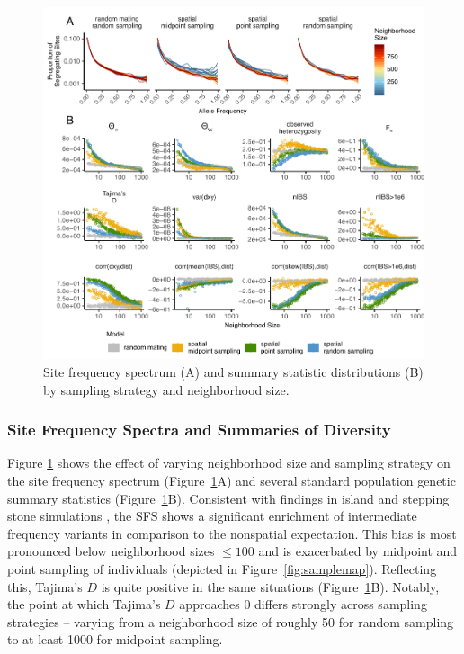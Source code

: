 \documentclass[10pt,twoside,lineno,hidelinks]{preprint}
\begin{document}
\begin{figure}[p]
\centering
\includegraphics[width=\textwidth]{figures/sfs_w_sumstats.pdf}
\caption{Site frequency spectrum (A) and summary statistic distributions (B) by sampling strategy and neighborhood size.}
\label{fig:sumstats}
\end{figure}


\subsubsection{Site Frequency Spectra and Summaries of Diversity}

Figure \ref{fig:sumstats} shows the effect of varying neighborhood size and sampling strategy on the site frequency spectrum (Figure~\ref{fig:sumstats}A) and several standard population genetic summary statistics (Figure~\ref{fig:sumstats}B). Consistent with findings in island and stepping stone simulations \citep{Stadler2009}, the SFS shows a significant enrichment of intermediate frequency variants in comparison to the nonspatial expectation. This bias is most pronounced below neighborhood sizes $\leq 100$ and is exacerbated by midpoint and point sampling of individuals (depicted in Figure~\ref{fig:samplemap}). 
Reflecting this, Tajima's $D$ is quite positive in the same situations (Figure~\ref{fig:sumstats}B). Notably, the point at which Tajima's $D$ approaches 0 differs strongly across sampling strategies -- varying from a neighborhood size of roughly 50 for random sampling to at least 1000 for midpoint sampling. 
\end{document}
